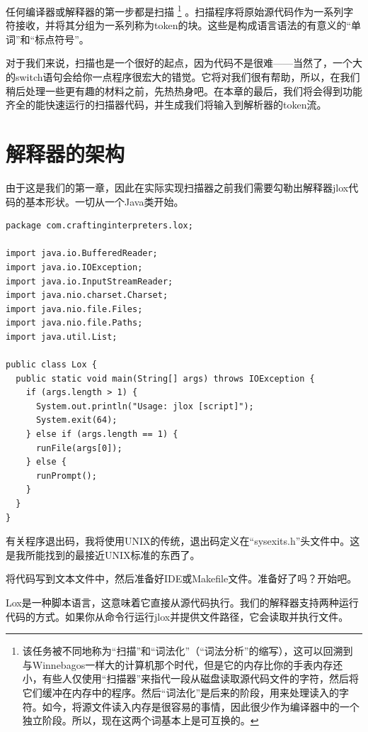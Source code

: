 \documentclass[cn,10pt,math=newtx,citestyle=gb7714-2015,bibstyle=gb7714-2015]{elegantbook}
\newenvironment{code}{\captionsetup{type=listing}}{}
\begin{document}
任何编译器或解释器的第一步都是扫描 \footnote{该任务被不同地称为“扫描”和“词法化”（“词法分析”的缩写），这可以回溯到与Winnebagos一样大的计算机那个时代，但是它的内存比你的手表内存还小，有些人仅使用“扫描器”来指代一段从磁盘读取源代码文件的字符，然后将它们缓冲在内存中的程序。然后“词法化”是后来的阶段，用来处理读入的字符。如今，将源文件读入内存是很容易的事情，因此很少作为编译器中的一个独立阶段。所以，现在这两个词基本上是可互换的。} 。扫描程序将原始源代码作为一系列字符接收，并将其分组为一系列称为token的块。这些是构成语言语法的有意义的“单词”和“标点符号”。

对于我们来说，扫描也是一个很好的起点，因为代码不是很难——当然了，一个大的switch语句会给你一点程序很宏大的错觉。它将对我们很有帮助，所以，在我们稍后处理一些更有趣的材料之前，先热热身吧。在本章的最后，我们将会得到功能齐全的能快速运行的扫描器代码，并生成我们将输入到解析器的token流。

\section{解释器的架构}

由于这是我们的第一章，因此在实际实现扫描器之前我们需要勾勒出解释器jlox代码的基本形状。一切从一个Java类开始。

\begin{code}
\begin{verbatim}
package com.craftinginterpreters.lox;

import java.io.BufferedReader;
import java.io.IOException;
import java.io.InputStreamReader;
import java.nio.charset.Charset;
import java.nio.file.Files;
import java.nio.file.Paths;
import java.util.List;

public class Lox {
  public static void main(String[] args) throws IOException {
    if (args.length > 1) {
      System.out.println("Usage: jlox [script]");
      System.exit(64); 
    } else if (args.length == 1) {
      runFile(args[0]);
    } else {
      runPrompt();
    }
  }
}
\end{verbatim}
\end{code}

\begin{tcolorbox}
有关程序退出码，我将使用UNIX的传统，退出码定义在“sysexits.h”头文件中。这是我所能找到的最接近UNIX标准的东西了。
\end{tcolorbox}

将代码写到文本文件中，然后准备好IDE或Makefile文件。准备好了吗？开始吧。

Lox是一种脚本语言，这意味着它直接从源代码执行。我们的解释器支持两种运行代码的方式。如果你从命令行运行jlox并提供文件路径，它会读取并执行文件。
\end{document}
